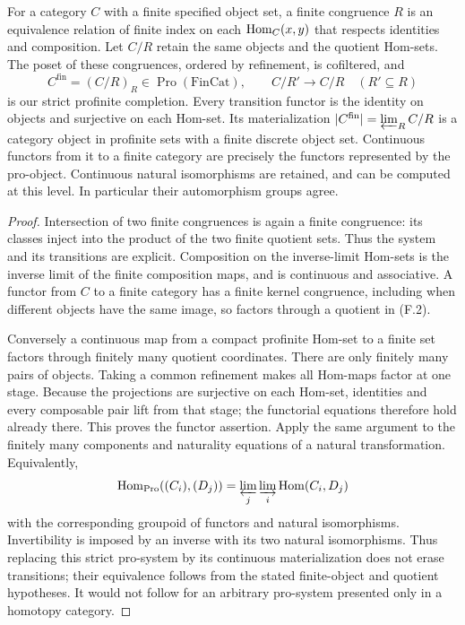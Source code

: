 For a category $C$ with a finite specified object set, a finite congruence $R$ is an equivalence relation of finite index on each $\operatorname{Hom}_C(x,y)$ that respects identities and composition. Let $C/R$ retain the same objects and the quotient Hom-sets. The poset of these congruences, ordered by refinement, is cofiltered, and
\[
 C^{\mathrm{fin}}=(C/R)_R\in\operatorname{Pro}(\mathrm{FinCat}),
 \qquad C/R'\longrightarrow C/R\quad(R'\subseteq R)             \tag{F.2}
\]
is our strict profinite completion. Every transition functor is the identity on objects and surjective on each Hom-set. Its materialization $|C^{\mathrm{fin}}|=\varprojlim_R C/R$ is a category object in profinite sets with a finite discrete object set. Continuous functors from it to a finite category are precisely the functors represented by the pro-object. Continuous natural isomorphisms are retained, and can be computed at this level. In particular their automorphism groups agree.
\begin{proof}
Intersection of two finite congruences is again a finite congruence: its classes inject into the product of the two finite quotient sets. Thus the system and its transitions are explicit. Composition on the inverse-limit Hom-sets is the inverse limit of the finite composition maps, and is continuous and associative. A functor from $C$ to a finite category has a finite kernel congruence, including when different objects have the same image, so factors through a quotient in (F.2).

Conversely a continuous map from a compact profinite Hom-set to a finite set factors through finitely many quotient coordinates. There are only finitely many pairs of objects. Taking a common refinement makes all Hom-maps factor at one stage. Because the projections are surjective on each Hom-set, identities and every composable pair lift from that stage; the functorial equations therefore hold already there. This proves the functor assertion. Apply the same argument to the finitely many components and naturality equations of a natural transformation. Equivalently,
\[
 \operatorname{Hom}_{\operatorname{Pro}}((C_i),(D_j))
   =\varprojlim_j\varinjlim_i\operatorname{Hom}(C_i,D_j)
\]
with the corresponding groupoid of functors and natural isomorphisms. Invertibility is imposed by an inverse with its two natural isomorphisms. Thus replacing this strict pro-system by its continuous materialization does not erase transitions; their equivalence follows from the stated finite-object and quotient hypotheses. It would not follow for an arbitrary pro-system presented only in a homotopy category.
\end{proof}

